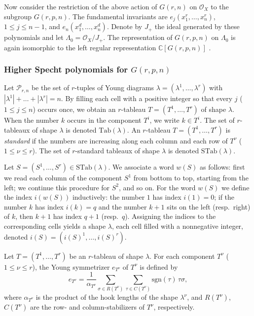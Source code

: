 \documentclass[11pt,a4paper]{article}
\begin{document}
Now consider the restriction of the above action of $G(r,n)$ on
$\mathcal{O}_X$ to the subgroup $G(r,p,n)$. The fundamental invariants
are $e_j(x_1^r,\dots,x_n^r)$, $1 \le j \le n-1$, and
$e_n(x_1^d,\dots,x_n^d)$. Denote by $J_+$ the ideal generated by these
polynomials and let $\Lambda_0 = \mathcal{O}_X/J_+$. The representation
of $G(r,p,n)$ on $\Lambda_0$ is again isomorphic to the left regular
representation $\mathbb{C}[G(r,p,n)]$ \cite{MoritaYamada1998}.

\subsubsection{Higher Specht polynomials for $G(r,p,n)$}\label{subsubsec:shift}

Let $\mathcal{P}_{r,n}$ be the set of $r$-tuples of Young diagrams
$\lambda = (\lambda^1,\dots,\lambda^r)$ with
$|\lambda^1|+\dots+|\lambda^r|=n$. By filling each cell with a
positive integer so that every $j$ ($1 \le j \le n$) occurs once, we
obtain an $r$-tableau $T=(T^1,\dots,T^r)$ of shape $\lambda$. When the
number $k$ occurs in the component $T^i$, we write $k \in T^i$. The
set of $r$-tableaux of shape $\lambda$ is denoted $\mathrm{Tab}(\lambda)$.
An $r$-tableau $T=(T^1,\dots,T^r)$ is \emph{standard} if the numbers
are increasing along each column and each row of $T^\nu$
($1 \le \nu \le r$). The set of $r$-standard tableaux of shape
$\lambda$ is denoted $\mathrm{STab}(\lambda)$.

Let $S=(S^1,\dots,S^r) \in \mathrm{STab}(\lambda)$. We associate a
word $w(S)$ as follows: first we read each column of the component
$S^1$ from bottom to top, starting from the left; we continue this
procedure for $S^2$, and so on. For the word $w(S)$ we define the
index $i(w(S))$ inductively: the number $1$ has index $i(1)=0$; if the
number $k$ has index $i(k)=q$ and the number $k+1$ sits on the left
(resp.\ right) of $k$, then $k+1$ has index $q+1$ (resp.\ $q$).
Assigning the indices to the corresponding cells yields a shape
$\lambda$, each cell filled with a nonnegative integer, denoted
$i(S) = (i(S)^1,\dots,i(S)^r)$.

Let $T=(T^1,\dots,T^r)$ be an $r$-tableau of shape $\lambda$. For each
component $T^\nu$ ($1 \le \nu \le r$), the Young symmetrizer
$e_{T^\nu}$ of $T^\nu$ is defined by
\[
  e_{T^\nu} = \frac{1}{\alpha_{T^\nu}}
    \sum_{\sigma \in R(T^\nu)} \sum_{\tau \in C(T^\nu)} \mathrm{sgn}(\tau)\,\tau\sigma,
\]
where $\alpha_{T^\nu}$ is the product of the hook lengths of the shape
$\lambda^\nu$, and $R(T^\nu)$, $C(T^\nu)$ are the row- and
column-stabilizers of $T^\nu$, respectively.
\end{document}
